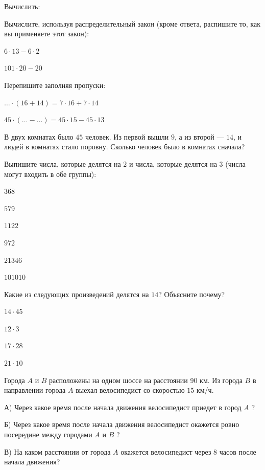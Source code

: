 \begin{listofex}
	\item Вычислить:
	\begin{enumcols}[itemcolumns=1]
		\item {}
		\item {}
	\end{enumcols}
	\item Вычислите, используя распределительный закон (кроме ответа, распишите то, как вы применяете этот закон):
	\begin{enumcols}[itemcolumns=2]
		\item \( 6\cdot13-6\cdot2 \)
		\item \( 101\cdot20-20 \)
	\end{enumcols}
	\item Перепишите заполняя пропуски:
	\begin{enumcols}[itemcolumns=2]
		\item \( {\dots}\cdot(16+14)=7\cdot16+7\cdot14 \)
		\item \( 45\cdot({\dots}-{\dots})=45\cdot15-45\cdot13 \)
	\end{enumcols}
	\item В двух комнатах было \( 45 \) человек. Из первой вышли \( 9 \), а из второй --- \( 14 \), и людей в комнатах стало поровну. Сколько человек было в комнатах сначала?
	\item Выпишите числа, которые делятся на \( 2 \) и числа, которые делятся на \( 3 \) (числа могут входить в обе группы):
	\begin{enumcols}[itemcolumns=6]
		\item \( 368 \)
		\item \( 579 \)
		\item \( 1122 \)
		\item \( 972 \)
		\item \( 21346\)
		\item \( 101010 \)
	\end{enumcols}
	\item Какие из следующих произведений делятся на \( 14 \)? Объясните почему?
	\begin{enumcols}[itemcolumns=4]
		\item \( 14\cdot45 \)
		\item \( 12\cdot3 \)
		\item \( 17\cdot28 \)
		\item \( 21\cdot10 \)
	\end{enumcols}
	\item Города \( A \) и \( B \) расположены на одном шоссе на расстоянии 90 км. Из города \( B \) в
	направлении города \( A \) выехал велосипедист со скоростью \( 15 \) км/ч.
	\begin{enumcols}[itemcolumns=1]
		\item[А)] Через какое время после начала движения велосипедист приедет в город \( A \) ?
		\item[Б)] Через какое время после начала движения велосипедист окажется ровно посередине между
		городами \( A \) и \( B \) ?
		\item[В)] На каком расстоянии от города \( A \) окажется велосипедист через 8 часов после начала
		движения?
	\end{enumcols}
\end{listofex}
